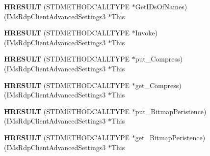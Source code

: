 \begin{DoxyCompactItemize}
\item 
\mbox{\label{struct_i_ms_rdp_client_advanced_settings3_vtbl_a17738d64a9282bcf5dbbd3370fad5760}} 
{\bfseries H\+R\+E\+S\+U\+LT} (S\+T\+D\+M\+E\+T\+H\+O\+D\+C\+A\+L\+L\+T\+Y\+PE $\ast$Get\+I\+Ds\+Of\+Names)(I\+Ms\+Rdp\+Client\+Advanced\+Settings3 $\ast$This
\item 
\mbox{\label{struct_i_ms_rdp_client_advanced_settings3_vtbl_a2b74605b1778da000068f51814b2656a}} 
{\bfseries H\+R\+E\+S\+U\+LT} (S\+T\+D\+M\+E\+T\+H\+O\+D\+C\+A\+L\+L\+T\+Y\+PE $\ast$Invoke)(I\+Ms\+Rdp\+Client\+Advanced\+Settings3 $\ast$This
\item 
\mbox{\label{struct_i_ms_rdp_client_advanced_settings3_vtbl_a5d747b0d06f237f6d682aeaa0ea37c58}} 
{\bfseries H\+R\+E\+S\+U\+LT} (S\+T\+D\+M\+E\+T\+H\+O\+D\+C\+A\+L\+L\+T\+Y\+PE $\ast$put\+\_\+\+Compress)(I\+Ms\+Rdp\+Client\+Advanced\+Settings3 $\ast$This
\item 
\mbox{\label{struct_i_ms_rdp_client_advanced_settings3_vtbl_a48ab35da5a3583ce2af3f6c793c32394}} 
{\bfseries H\+R\+E\+S\+U\+LT} (S\+T\+D\+M\+E\+T\+H\+O\+D\+C\+A\+L\+L\+T\+Y\+PE $\ast$get\+\_\+\+Compress)(I\+Ms\+Rdp\+Client\+Advanced\+Settings3 $\ast$This
\item 
\mbox{\label{struct_i_ms_rdp_client_advanced_settings3_vtbl_ae8ae808d16723eac2eb6b5bb7a6012fa}} 
{\bfseries H\+R\+E\+S\+U\+LT} (S\+T\+D\+M\+E\+T\+H\+O\+D\+C\+A\+L\+L\+T\+Y\+PE $\ast$put\+\_\+\+Bitmap\+Peristence)(I\+Ms\+Rdp\+Client\+Advanced\+Settings3 $\ast$This
\item 
\mbox{\label{struct_i_ms_rdp_client_advanced_settings3_vtbl_a896e7b9b223aabf0fe80411e279c61c6}} 
{\bfseries H\+R\+E\+S\+U\+LT} (S\+T\+D\+M\+E\+T\+H\+O\+D\+C\+A\+L\+L\+T\+Y\+PE $\ast$get\+\_\+\+Bitmap\+Peristence)(I\+Ms\+Rdp\+Client\+Advanced\+Settings3 $\ast$This
\item 
\mbox{\label{struct_i_ms_rdp_client_advanced_settings3_vtbl_a69dd626115e144d5d35b9922a2d263cd}} 

\end{DoxyCompactItemize}
